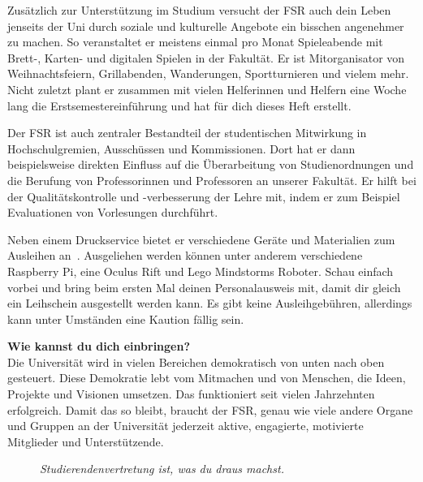 Zusätzlich zur Unterstützung im Studium versucht der FSR auch dein Leben jenseits der Uni durch soziale und kulturelle Angebote ein bisschen angenehmer zu machen.
So veranstaltet er meistens einmal pro Monat Spieleabende mit Brett-, Karten- und digitalen Spielen in der Fakultät.
Er ist Mitorganisator von Weihnachtsfeiern, Grillabenden, Wanderungen, Sportturnieren und vielem mehr.
Nicht zuletzt plant er zusammen mit vielen Helferinnen und Helfern eine Woche lang die Erstsemestereinführung und hat für dich dieses Heft erstellt.

Der FSR ist auch zentraler Bestandteil der studentischen Mitwirkung in Hochschulgremien, Ausschüssen und Kommissionen.
Dort hat er dann beispielsweise direkten Einfluss auf die Überarbeitung von Studienordnungen und die Berufung von Professorinnen und Professoren an unserer Fakultät.
Er hilft bei der Qualitätskontrolle und -verbesserung der Lehre mit, indem er zum Beispiel Evaluationen von Vorlesungen durchführt.

Neben einem Druckservice bietet er verschiedene Geräte und Materialien zum Ausleihen an~.
Ausgeliehen werden können unter anderem verschiedene Raspberry Pi, eine Oculus Rift und Lego Mindstorms Roboter.
Schau einfach vorbei und bring beim ersten Mal deinen Personalausweis mit, damit dir gleich ein Leihschein ausgestellt werden kann.
Es gibt keine Ausleihgebühren, allerdings kann unter Umständen eine Kaution fällig sein.

\textbf{Wie kannst du dich einbringen?} \\
Die Universität wird in vielen Bereichen demokratisch von unten nach oben gesteuert. Diese Demokratie lebt vom Mitmachen und von Menschen, die Ideen, Projekte und Visionen umsetzen.
Das funktioniert seit vielen Jahrzehnten erfolgreich.
Damit das so bleibt, braucht der FSR, genau wie viele andere Organe und Gruppen an der Universität jederzeit aktive, engagierte, motivierte Mitglieder und Unterstützende.

\begin{figure}[h!]
\centering
\textit{Studierendenvertretung ist, was du draus machst.}
\end{figure}


